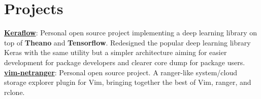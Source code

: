 \documentclass[a4paper,9pt]{article}
\begin{document}
%
%
%



\section{Projects}
\href{https://github.com/ipod825/keraflow}{\textbf{Keraflow}}: Personal open source project implementing a deep learning library on top of \textbf{Theano} and \textbf{Tensorflow}. Redesigned the popular deep learning library Keras with the same utility but a simpler architecture aiming for easier development for package developers and clearer core dump for package users. \\
\href{https://github.com/ipod825/vim-netranger}{\textbf{vim-netranger}}: Personal open source project. A ranger-like system/cloud storage explorer plugin for Vim, bringing together the best of Vim, ranger, and rclone.  \\
\end{document}
